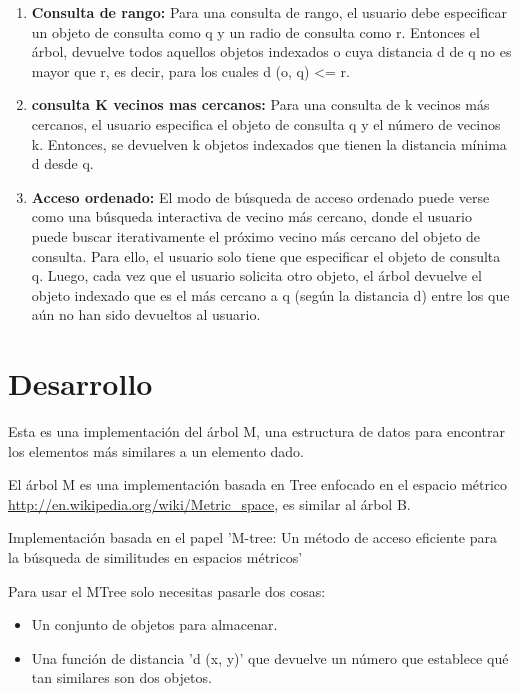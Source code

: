 \documentclass[a4paper]{article}
\begin{document}
\begin{enumerate}
    \item \textbf{Consulta de rango:}
     Para una consulta de rango, el usuario debe especificar un objeto de consulta como q y un radio de consulta como  r. Entonces el árbol, devuelve todos aquellos objetos indexados o cuya distancia d de q no es mayor que r, es decir, para los cuales d (o, q) <= r.
     
     \item \textbf{consulta K vecinos mas cercanos:}
      Para una consulta de k vecinos más cercanos, el usuario especifica el objeto de consulta q y el número de vecinos k. Entonces, se devuelven k objetos indexados que tienen la distancia mínima d desde q.
      
      \item \textbf{Acceso ordenado:}  El modo de búsqueda de acceso ordenado puede verse como una búsqueda interactiva de vecino más cercano, donde el usuario puede buscar iterativamente el próximo vecino más cercano del objeto de consulta. Para ello, el usuario solo tiene que especificar el objeto de consulta q. Luego, cada vez que el usuario solicita otro objeto, el árbol devuelve el objeto indexado que es el más cercano a q (según la distancia d) entre los que aún no han sido devueltos al usuario\cite{pag}.
\end{enumerate}


\section{Desarrollo}


Esta es una implementación del árbol M, una estructura de datos para encontrar los elementos más similares a un elemento dado.

El árbol M es una implementación basada en Tree enfocado en el   espacio métrico
\url{http://en.wikipedia.org/wiki/Metric_space}, es similar al árbol B.

Implementación basada en el papel
'M-tree: Un método de acceso eficiente para la búsqueda de similitudes en espacios métricos'

Para usar el  MTree solo necesitas pasarle dos cosas:
\begin{itemize}
    \item Un conjunto de objetos para almacenar.
    
    \item Una función de distancia 'd (x, y)' que devuelve un número que establece
qué tan similares son dos objetos.
\end{itemize}
\end{document}
